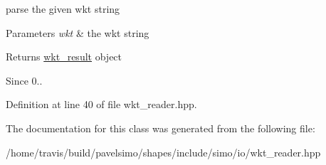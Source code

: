 parse the given wkt string 


\begin{DoxyParams}{Parameters}
{\em wkt} & the wkt string \\
\hline
\end{DoxyParams}
\begin{DoxyReturn}{Returns}
\hyperlink{structsimo_1_1shapes_1_1wkt__result}{wkt\-\_\-result} object
\end{DoxyReturn}
\begin{DoxySince}{Since}
0.. 
\end{DoxySince}


Definition at line 40 of file wkt\-\_\-reader.\-hpp.



The documentation for this class was generated from the following file\-:\begin{DoxyCompactItemize}
\item 
/home/travis/build/pavelsimo/shapes/include/simo/io/wkt\-\_\-reader.\-hpp\end{DoxyCompactItemize}
